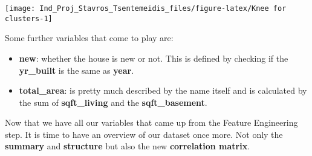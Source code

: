 \documentclass[]{article}
\providecommand{\tightlist}{%
  \setlength{\itemsep}{0pt}\setlength{\parskip}{0pt}}
\begin{document}
\begin{center}\texttt{[image: Ind\_Proj\_Stavros\_Tsentemeidis\_files/figure-latex/Knee for clusters-1]} \end{center}

Some further variables that come to play are:

\begin{itemize}
\tightlist
\item
  \textbf{new}: whether the house is new or not. This is defined by
  checking if the \textbf{yr\_built} is the same as \textbf{year}.\\
\item
  \textbf{total\_area}: is pretty much described by the name itself and
  is calculated by the sum of \textbf{sqft\_living} and the
  \textbf{sqft\_basement}.
\end{itemize}

Now that we have all our variables that came up from the Feature
Engineering step. It is time to have an overview of our dataset once
more. Not only the \textbf{summary} and \textbf{structure} but also the
new \textbf{correlation matrix}.
\end{document}
